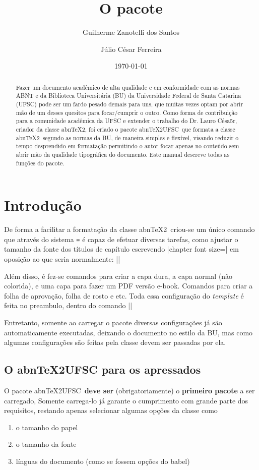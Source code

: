 \documentclass[openright,draft]{memoir}
\title{\sffamily O pacote \abntexUFSC}
\date{\today}
\author{Guilherme Zanotelli dos Santos\and Júlio César Ferreira}
\newcommand*{\abntex}{abn\TeX2}
\newcommand*{\abntexUFSC}{abn\TeX2UFSC}
\newcommand{\emingles}[1]{\foreignlanguage{english}{\textit{#1}}}
\begin{document}
\frontmatter
\maketitle
\begin{abstract}
Fazer um documento acadêmico de alta qualidade e em conformidade com as normas ABNT e da Biblioteca Universitária (BU) da Universidade Federal de Santa Catarina (UFSC) pode ser um fardo pesado demais para uns, que muitas vezes optam por abrir mão de um desses quesitos para focar/cumprir o outro. Como forma de contribuição para a comunidade acadêmica da UFSC e extender o trabalho do Dr. Lauro Césa5r, criador da classe \abntex, foi criado o pacote \abntexUFSC\ que formata a classe \abntex\ segundo as normas da BU, de maneira simples e flexível, visando reduzir o tempo desprendido em formatação permitindo o autor focar apenas no conteúdo sem abrir mão da qualidade tipográfica do documento. Este manual descreve todas as funções do pacote.
\end{abstract}
\tableofcontents*
\mainmatter
\chapter{Introdução}
De forma a facilitar a formatação da classe \abntex\ criou-se um único comando que através do sistema \texttt{=} é capaz de efetuar diversas tarefas, como ajustar o tamanho da fonte dos títulos de capítulo escrevendo \displaycode|chapter font size=\huge| em oposição ao que seria normalmente: \displaycode|\renewcommand{\ABNTEXchapterfontsize}{\huge}|

Além disso, é fez-se comandos para criar a capa dura, a capa normal (não colorida), e uma capa para fazer um PDF versão e-book. Comandos para criar a folha de aprovação, folha de rosto e etc. Toda essa configuração do \emingles{template} é feita no preambulo, dentro do comando \displaycode||

Entretanto, somente ao carregar o pacote diversas configurações já são automaticamente executadas, deixando o documento no estilo da BU, mas como algumas configurações são feitas pela classe devem ser passadas por ela.

\section{O \texorpdfstring{\abntexUFSC}{abnTeX2UFSC} para os apressados}
O pacote \abntexUFSC\ \textbf{deve ser} (obrigatoriamente) o \textbf{primeiro pacote} a ser carregado, Somente carrega-lo já garante o cumprimento com grande parte dos requisitos, restando apenas selecionar algumas opções da classe como \begin{enumerate}
\item o tamanho do papel
\item o tamanho da fonte
\item línguas do documento (como se fossem opções do babel)
\end{enumerate}
\end{document}
